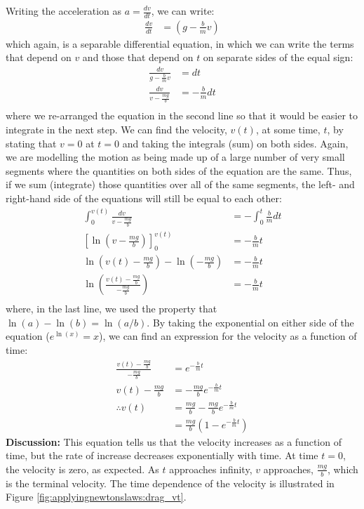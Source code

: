 \begin{example}
Writing the acceleration as $a=\frac{dv}{dt}$, we can write:
\begin{align*}
\frac{dv}{dt} &= \left(g-\frac{b}{m}v \right)
\end{align*}
which again, is a separable differential equation, in which we can write the terms that depend on $v$ and those that depend on $t$ on separate sides of the equal sign:
\begin{align*}
\frac{dv}{g-\frac{b}{m}v}&= dt\\
\frac{dv}{v-\frac{mg}{b}}&= -\frac{b}{m}dt\\
\end{align*}
	where we re-arranged the equation in the second line so that it would be easier to integrate in the next step. We can find the velocity, $v(t)$, at some time, $t$, by stating that $v=0$ at $t=0$ and taking the integrals (sum) on both sides. Again, we are modelling the motion as being made up of a large number of very small segments where the quantities on both sides of the equation are the same. Thus, if we sum (integrate) those quantities over all of the same segments, the left- and right-hand side of the equations will still be equal to each other:
\begin{align*}
\int_0^{v(t)}\frac{dv}{v-\frac{mg}{b}} &= -\int_0^t\frac{b}{m} dt\\
\left[\ln\left(v-\frac{mg}{b} \right)\right]_0^{v(t)} &=-\frac{b}{m}t\\
\ln\left(v(t)-\frac{mg}{b} \right)-\ln\left(-\frac{mg}{b} \right)&=-\frac{b}{m}t\\
\ln\left( \frac{v(t)-\frac{mg}{b}}{-\frac{mg}{b}} \right)&=-\frac{b}{m}t\\
\end{align*}
where, in the last line, we used the property that $\ln(a)-\ln(b)=\ln(a/b)$. By taking the exponential on either side of the equation ($e^{\ln(x)}=x$), we can find an expression for the velocity as a function of time:
\begin{align*}
\frac{v(t)-\frac{mg}{b}}{-\frac{mg}{b}} &= e^{-\frac{b}{m}t}\\
v(t)-\frac{mg}{b} &= -\frac{mg}{b}e^{-\frac{b}{m}t}\\
\therefore v(t) &= \frac{mg}{b}-\frac{mg}{b}e^{-\frac{b}{m}t}\\
&=\frac{mg}{b}\left(1-e^{-\frac{b}{m}t}\right)
\end{align*}
\textbf{Discussion:} This equation tells us that the velocity increases as a function of time, but the rate of increase decreases exponentially with time. At time $t=0$, the velocity is zero, as expected. As $t$ approaches infinity, $v$ approaches, $\frac{mg}{b}$, which is the terminal velocity. The time dependence of the velocity is illustrated in Figure \ref{fig:applyingnewtonslaws:drag_vt}.


 
\end{example}

